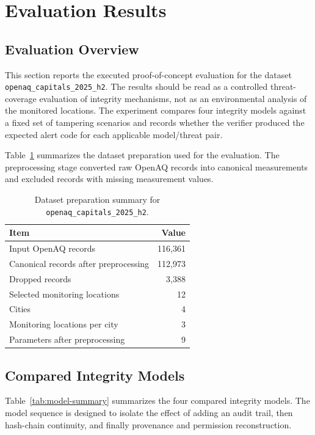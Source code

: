 \section{Evaluation Results}

\subsection{Evaluation Overview}

This section reports the executed proof-of-concept evaluation for the dataset \texttt{openaq\_capitals\_2025\_h2}. The results should be read as a controlled threat-coverage evaluation of integrity mechanisms, not as an environmental analysis of the monitored locations. The experiment compares four integrity models against a fixed set of tampering scenarios and records whether the verifier produced the expected alert code for each applicable model/threat pair.

Table~\ref{tab:dataset-summary} summarizes the dataset preparation used for the evaluation. The preprocessing stage converted raw OpenAQ records into canonical measurements and excluded records with missing measurement values.

\begin{table}[htbp]
\centering
\caption{Dataset preparation summary for \texttt{openaq\_capitals\_2025\_h2}.}
\label{tab:dataset-summary}
\begin{tabular}{lr}
\toprule
Item & Value \\
\midrule
Input OpenAQ records & 116,361 \\
Canonical records after preprocessing & 112,973 \\
Dropped records & 3,388 \\
Selected monitoring locations & 12 \\
Cities & 4 \\
Monitoring locations per city & 3 \\
Parameters after preprocessing & 9 \\
\bottomrule
\end{tabular}
\end{table}

\subsection{Compared Integrity Models}

Table~\ref{tab:model-summary} summarizes the four compared integrity models. The model sequence is designed to isolate the effect of adding an audit trail, then hash-chain continuity, and finally provenance and permission reconstruction.

